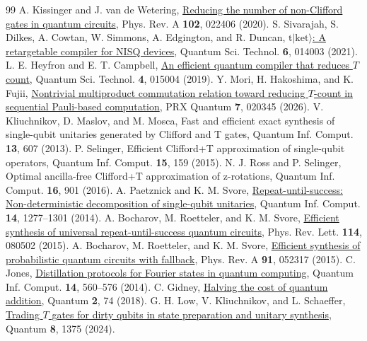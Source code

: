 \documentclass[aps,prx,twocolumn,superscriptaddress,nofootinbib,longbibliography]{revtex4-2}
\theoremstyle{plain}
\theoremstyle{definition}
\theoremstyle{remark}
\begin{document}
\begin{thebibliography}{99}
 A. Kissinger and J. van de Wetering, \href{https://doi.org/10.1103/PhysRevA.102.022406}{Reducing the number of non-Clifford gates in quantum circuits}, Phys. Rev. A \textbf{102}, 022406 (2020).
 S. Sivarajah, S. Dilkes, A. Cowtan, W. Simmons, A. Edgington, and R. Duncan, \href{https://doi.org/10.1088/2058-9565/ab8e92}{$\mathrm{t}|\mathrm{ket}\rangle$: A retargetable compiler for NISQ devices}, Quantum Sci. Technol. \textbf{6}, 014003 (2021).
 L. E. Heyfron and E. T. Campbell, \href{https://doi.org/10.1088/2058-9565/aad604}{An efficient quantum compiler that reduces $T$ count}, Quantum Sci. Technol. \textbf{4}, 015004 (2019).
 Y. Mori, H. Hakoshima, and K. Fujii, \href{https://doi.org/10.1103/qw5z-3bwz}{Nontrivial multiproduct commutation relation toward reducing $T$-count in sequential Pauli-based computation}, PRX Quantum \textbf{7}, 020345 (2026).
 V. Kliuchnikov, D. Maslov, and M. Mosca, Fast and efficient exact synthesis of single-qubit unitaries generated by Clifford and T gates, Quantum Inf. Comput. \textbf{13}, 607 (2013).
 P. Selinger, Efficient Clifford+T approximation of single-qubit operators, Quantum Inf. Comput. \textbf{15}, 159 (2015).
 N. J. Ross and P. Selinger, Optimal ancilla-free Clifford+T approximation of z-rotations, Quantum Inf. Comput. \textbf{16}, 901 (2016).
 A. Paetznick and K. M. Svore, \href{https://doi.org/10.26421/QIC14.15-16-2}{Repeat-until-success: Non-deterministic decomposition of single-qubit unitaries}, Quantum Inf. Comput. \textbf{14}, 1277--1301 (2014).
 A. Bocharov, M. Roetteler, and K. M. Svore, \href{https://doi.org/10.1103/PhysRevLett.114.080502}{Efficient synthesis of universal repeat-until-success quantum circuits}, Phys. Rev. Lett. \textbf{114}, 080502 (2015).
 A. Bocharov, M. Roetteler, and K. M. Svore, \href{https://doi.org/10.1103/PhysRevA.91.052317}{Efficient synthesis of probabilistic quantum circuits with fallback}, Phys. Rev. A \textbf{91}, 052317 (2015).
 C. Jones, \href{https://doi.org/10.26421/QIC14.7-8-2}{Distillation protocols for Fourier states in quantum computing}, Quantum Inf. Comput. \textbf{14}, 560--576 (2014).
 C. Gidney, \href{https://doi.org/10.22331/q-2018-06-18-74}{Halving the cost of quantum addition}, Quantum \textbf{2}, 74 (2018).
 G. H. Low, V. Kliuchnikov, and L. Schaeffer, \href{https://doi.org/10.22331/q-2024-06-17-1375}{Trading $T$ gates for dirty qubits in state preparation and unitary synthesis}, Quantum \textbf{8}, 1375 (2024).

\end{thebibliography}
\end{document}
